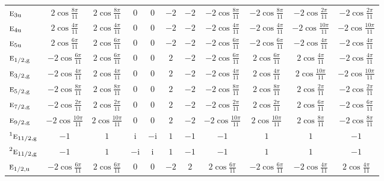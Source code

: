 \documentclass[10pt,a4paper]{article}
\makeatletter
\def\grouprule#1#2{\noalign{\marks\LTgroupmarks{\the\belowrulesep}\nobreak\vskip#1%
  \vskip\aboverulesep}\multispan\LT@cols\unskip{\leaders\hrule\@height#2\hfill\kern\z@}\cr
  \noalign{\penalty\LTrulebreak\vskip\belowrulesep\global\@lastruleclass\z@}}
\numberwithin{equation}{section}
\newcommand{\irr}[1]{\text{\normalfont\scshape #1}}
\newcommand{\conjpair}[1]{{}^{#1}}
\newcommand{\ptag}[1]{\mathrm{#1}}
\newcommand{\iunit}{\mathrm{i}}
\makeatother
\begin{document}
{{\begin{longtable}{@{}lcccccccccc@{}}
$\irr{e}_{3\ptag{u}}$ & $2\cos\tfrac{8\pi}{11}$ & $2\cos\tfrac{8\pi}{11}$ & $0$ & $0$ & $-2$ & $-2$ & $-2\cos\tfrac{8\pi}{11}$ & $-2\cos\tfrac{8\pi}{11}$ & $-2\cos\tfrac{2\pi}{11}$ & $-2\cos\tfrac{2\pi}{11}$\\
$\irr{e}_{4\ptag{u}}$ & $2\cos\tfrac{4\pi}{11}$ & $2\cos\tfrac{4\pi}{11}$ & $0$ & $0$ & $-2$ & $-2$ & $-2\cos\tfrac{4\pi}{11}$ & $-2\cos\tfrac{4\pi}{11}$ & $-2\cos\tfrac{10\pi}{11}$ & $-2\cos\tfrac{10\pi}{11}$\\
$\irr{e}_{5\ptag{u}}$ & $2\cos\tfrac{6\pi}{11}$ & $2\cos\tfrac{6\pi}{11}$ & $0$ & $0$ & $-2$ & $-2$ & $-2\cos\tfrac{6\pi}{11}$ & $-2\cos\tfrac{6\pi}{11}$ & $-2\cos\tfrac{4\pi}{11}$ & $-2\cos\tfrac{4\pi}{11}$\\
\grouprule{0pt}{\lightrulewidth}
$\irr{e}_{1/2,\ptag{g}}$ & $-2\cos\tfrac{6\pi}{11}$ & $2\cos\tfrac{6\pi}{11}$ & $0$ & $0$ & $2$ & $-2$ & $-2\cos\tfrac{6\pi}{11}$ & $2\cos\tfrac{6\pi}{11}$ & $2\cos\tfrac{4\pi}{11}$ & $-2\cos\tfrac{4\pi}{11}$\\
$\irr{e}_{3/2,\ptag{g}}$ & $-2\cos\tfrac{4\pi}{11}$ & $2\cos\tfrac{4\pi}{11}$ & $0$ & $0$ & $2$ & $-2$ & $-2\cos\tfrac{4\pi}{11}$ & $2\cos\tfrac{4\pi}{11}$ & $2\cos\tfrac{10\pi}{11}$ & $-2\cos\tfrac{10\pi}{11}$\\
$\irr{e}_{5/2,\ptag{g}}$ & $-2\cos\tfrac{8\pi}{11}$ & $2\cos\tfrac{8\pi}{11}$ & $0$ & $0$ & $2$ & $-2$ & $-2\cos\tfrac{8\pi}{11}$ & $2\cos\tfrac{8\pi}{11}$ & $2\cos\tfrac{2\pi}{11}$ & $-2\cos\tfrac{2\pi}{11}$\\
$\irr{e}_{7/2,\ptag{g}}$ & $-2\cos\tfrac{2\pi}{11}$ & $2\cos\tfrac{2\pi}{11}$ & $0$ & $0$ & $2$ & $-2$ & $-2\cos\tfrac{2\pi}{11}$ & $2\cos\tfrac{2\pi}{11}$ & $2\cos\tfrac{6\pi}{11}$ & $-2\cos\tfrac{6\pi}{11}$\\
$\irr{e}_{9/2,\ptag{g}}$ & $-2\cos\tfrac{10\pi}{11}$ & $2\cos\tfrac{10\pi}{11}$ & $0$ & $0$ & $2$ & $-2$ & $-2\cos\tfrac{10\pi}{11}$ & $2\cos\tfrac{10\pi}{11}$ & $2\cos\tfrac{8\pi}{11}$ & $-2\cos\tfrac{8\pi}{11}$\\
$\conjpair{1}\irr{e}_{11/2,\ptag{g}}$ & $-1$ & $1$ & $\iunit{}$ & $-\iunit{}$ & $1$ & $-1$ & $-1$ & $1$ & $1$ & $-1$\\
$\conjpair{2}\irr{e}_{11/2,\ptag{g}}$ & $-1$ & $1$ & $-\iunit{}$ & $\iunit{}$ & $1$ & $-1$ & $-1$ & $1$ & $1$ & $-1$\\
$\irr{e}_{1/2,\ptag{u}}$ & $-2\cos\tfrac{6\pi}{11}$ & $2\cos\tfrac{6\pi}{11}$ & $0$ & $0$ & $-2$ & $2$ & $2\cos\tfrac{6\pi}{11}$ & $-2\cos\tfrac{6\pi}{11}$ & $-2\cos\tfrac{4\pi}{11}$ & $2\cos\tfrac{4\pi}{11}$\\

\end{longtable}}}
\end{document}
